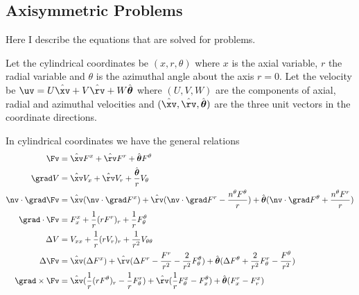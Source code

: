 \subsection{Axisymmetric Problems}

Here I describe the equations that are solved for  problems.

Let the cylindrical coordinates be $(x,r,\theta)$ where $x$ is the axial variable,
$r$ the radial variable and $\theta$ is the azimuthal angle
about the axis $r=0$. Let the velocity be $\uv = U \hat{\xv} + V \hat{\rv} + W \hat{\thetav}$
where $(U,V,W)$ are the components of axial, radial and azimuthal velocities and $(\hat{\xv},\hat{\rv},\hat{\thetav})$
are the three unit vectors in the coordinate directions.

In cylindrical coordinates we have the general relations
\begin{align*}
\Fv &= \hat{\xv} F^x + \hat{\rv} F^r + \hat{\thetav} F^\theta \\
\grad V &= \hat{\xv} V_x + \hat{\rv} V_r + {\hat{\thetav}\over r} V_\theta \\
\nv\cdot\grad \Fv &= \hat{\xv}( \nv\cdot\grad F^x ) + \hat{\rv}( \nv\cdot\grad F^r - {n^\theta F^\theta\over r})
                 + \hat{\thetav}( \nv\cdot\grad F^\theta + {n^\theta F^r\over r}) \\
\grad\cdot\Fv &= F^x_x + {1\over r}(rF^r)_r + {1\over r} F^\theta_\theta \\
\Delta V &= V_{xx} + {1\over r}(rV_r)_r + {1\over r^2} V_{\theta\theta} \\
\Delta \Fv &= \hat{\xv}( \Delta F^x ) + \hat{\rv}( \Delta F^r - {F^r\over r^2} - {2\over r^2} F^\theta_\theta)
          + \hat{\thetav}( \Delta F^\theta + {2\over r^2} F^r_\theta - {F^\theta \over r^2} ) \\
\grad\times\Fv &= \hat{\xv}( {1\over r} (rF^\theta)_r -{1\over r} F^r_\theta) +
                  \hat{\rv}({1\over r} F^x_\theta - F^\theta_x) +
                   \hat{\thetav}( F^r_x - F^x_r)
\end{align*}


